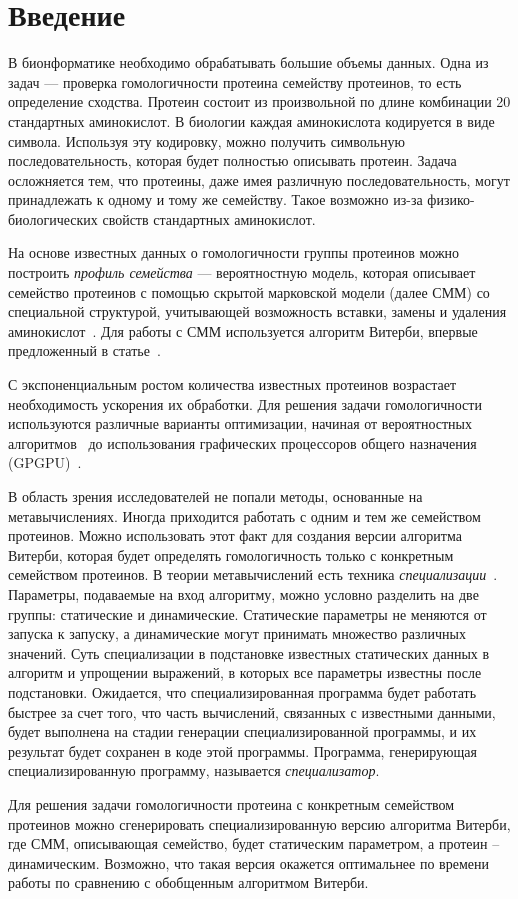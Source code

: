 \section*{Введение}

В бионформатике необходимо обрабатывать большие объемы данных.
Одна из задач --- проверка гомологичности протеина семейству протеинов, 
то есть определение сходства.
Протеин состоит из произвольной по длине комбинации 20 стандартных аминокислот.
В биологии каждая аминокислота кодируется в виде символа.
Используя эту кодировку, можно получить символьную последовательность,
которая будет полностью описывать протеин.
Задача осложняется тем, что протеины, даже имея различную последовательность,
могут принадлежать к одному и тому же семейству.
Такое возможно из-за физико-биологических свойств стандартных аминокислот.

На основе известных данных о гомологичности группы протеинов 
можно построить \emph{профиль семейства} --- вероятностную модель, 
которая описывает семейство протеинов с помощью 
скрытой марковской модели (далее СММ) со специальной структурой,
учитывающей возможность вставки, замены и удаления аминокислот~\cite{HMM_Eddy}.
Для работы с СММ используется алгоритм Витерби, впервые предложенный в статье~\cite{Viterbi}.

С экспоненциальным ростом количества известных протеинов возрастает
необходимость ускорения их обработки.
Для решения задачи гомологичности используются различные варианты оптимизации,
начиная от вероятностных алгоритмов~\cite{MSV_Eddy} 
до использования графических процессоров общего назначения (GPGPU)~\cite{cudampf}.

В область зрения исследователей не попали методы, 
основанные на метавычислениях.
Иногда приходится работать с одним и тем же семейством протеинов.
Можно использовать этот факт для создания версии алгоритма Витерби, 
которая будет определять гомологичность только с конкретным семейством протеинов.
В теории метавычислений есть техника \emph{специализации}~\cite{Jones_spec}.
Параметры, подаваемые на вход алгоритму, можно условно разделить на две группы:
статические и динамические.
Статические параметры не меняются от запуска к запуску, 
а динамические могут принимать множество различных значений.
Суть специализации в подстановке известных статических 
данных в алгоритм и упрощении выражений, 
в которых все параметры известны после подстановки.
Ожидается, что специализированная программа будет работать быстрее за счет того, что часть вычислений, связанных с известными данными, будет выполнена на стадии генерации специализированной программы,
и их результат будет сохранен в коде этой программы.
Программа, генерирующая специализированную программу, называется \emph{специализатор}.

Для решения задачи гомологичности протеина с конкретным семейством протеинов 
можно сгенерировать специализированную версию алгоритма Витерби,
где СММ, описывающая семейство, будет статическим параметром, 
а протеин -- динамическим.
Возможно, что такая версия окажется оптимальнее по времени работы 
по сравнению с обобщенным алгоритмом Витерби.

